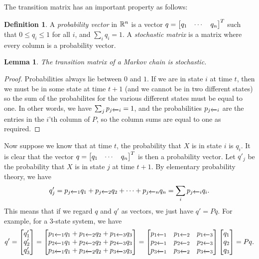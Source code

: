 \documentclass[reqno]{amsart}
\newtheorem{lemma}[theorem]{Lemma}
\theoremstyle{definition}
\newtheorem{definition}[theorem]{Definition}
\newcommand{\dfn}[1]{\emph{{#1}}\index{#1}}
\begin{document}
The transition matrix has an important property as follows:
\begin{definition}\label{defn-stochastic}
 A \dfn{probability vector} in ${\mathbb{R}}^n$ is a vector
 $q=\left[\begin{matrix} q_1 & \cdots & q_n\end{matrix}\right]^T$ such that $0\leq q_i\leq 1$ for all
 $i$, and $\sum_iq_i=1$.  A \emph{stochastic matrix} is a matrix where
 every column is a probability vector.
\end{definition}

\begin{lemma}\label{lem-markov-stochastic}
 The transition matrix of a Markov chain is stochastic.
\end{lemma}
\begin{proof}
 Probabilities always lie between $0$ and $1$.  If we are in state $i$
 at time $t$, then we must be in some state at time $t+1$ (and we
 cannot be in two different states) so the sum of the probabilites for
 the various different states must be equal to one.  In other words,
 we have $\sum_jp_{j\xleftarrow{}i}=1$, and the probabilities $p_{j\xleftarrow{}i}$
 are the entries in the $i$'th column of $P$, so the column sums are
 equal to one as required.
\end{proof}

Now suppose we know that at time $t$, the probability that $X$ is in
state $i$ is $q_i$.  It is clear that the vector
$q=\left[\begin{matrix} q_1 & \cdots & q_n\end{matrix}\right]^T$ is then a probability vector.
Let $q'_j$ be the probability that $X$ is in state $j$ at time $t+1$.
By elementary probability theory, we have
\[ q'_j = p_{j\xleftarrow{}1} q_1 +
          p_{j\xleftarrow{}2} q_2 + \dotsb +
          p_{j\xleftarrow{}n} q_n
        = \sum_i p_{j\xleftarrow{}i} q_i.
\]
This means that if we regard $q$ and $q'$ as vectors, we just have
$q'=Pq$.  For example, for a $3$-state system, we have
\[ q'
   = \left[\begin{matrix} q'_1\\ q'_2 \\ q'_3 \end{matrix}\right]
   = \left[\begin{matrix}
      p_{1\xleftarrow{}1} q_1 +  p_{1\xleftarrow{}2} q_2 +  p_{1\xleftarrow{}3} q_3 \\
      p_{2\xleftarrow{}1} q_1 +  p_{2\xleftarrow{}2} q_2 +  p_{2\xleftarrow{}3} q_3 \\
      p_{3\xleftarrow{}1} q_1 +  p_{3\xleftarrow{}2} q_2 +  p_{3\xleftarrow{}3} q_3
     \end{matrix}\right]
   = \left[\begin{matrix}
      p_{1\xleftarrow{}1} & p_{1\xleftarrow{}2} & p_{1\xleftarrow{}3} \\
      p_{2\xleftarrow{}1} & p_{2\xleftarrow{}2} & p_{2\xleftarrow{}3} \\
      p_{3\xleftarrow{}1} & p_{3\xleftarrow{}2} & p_{3\xleftarrow{}3}
     \end{matrix}\right]
     \left[\begin{matrix} q_1 \\ q_2 \\ q_3 \end{matrix}\right]
   = Pq.
\]
\end{document}

